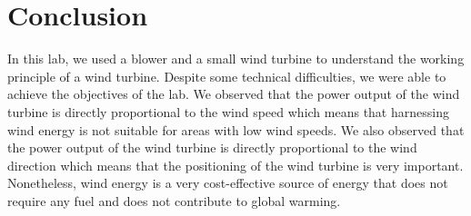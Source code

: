 \documentclass[a4paper, 12pt, english]{article}
\begin{document}
\section{Conclusion}
In this lab, we used a blower and a small wind turbine to understand the
working principle of a wind turbine. Despite some technical difficulties, we
were able to achieve the objectives of the lab. We observed that the power
output of the wind turbine is directly proportional to the wind speed which
means that harnessing wind energy is not suitable for areas with low wind
speeds. We also observed that the power output of the wind turbine is directly
proportional to the wind direction which means that the positioning of the wind
turbine is very important. Nonetheless, wind energy is a very cost-effective
source of energy that does not require any fuel and does not contribute to
global warming.
\end{document}
